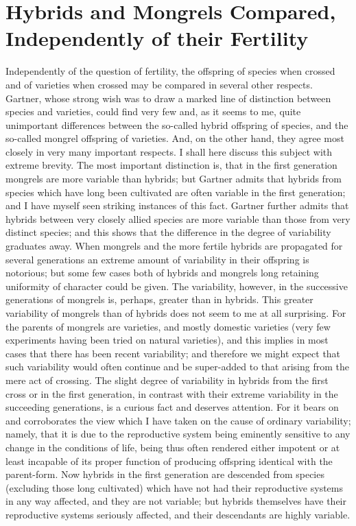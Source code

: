 \section{Hybrids and Mongrels Compared, Independently of their Fertility}
Independently of the question of fertility, the offspring of species when crossed and of varieties when crossed may be compared in several other respects. Gartner, whose strong wish was to draw a marked line of distinction between species and varieties, could find very few and, as it seems to me, quite unimportant differences between the so-called hybrid offspring of species, and the so-called mongrel offspring of varieties. And, on the other hand, they agree most closely in very many important respects.
I shall here discuss this subject with extreme brevity. The most important distinction is, that in the first generation mongrels are more variable than hybrids; but Gartner admits that hybrids from species which have long been cultivated are often variable in the first generation; and I have myself seen striking instances of this fact. Gartner further admits that hybrids between very closely allied species are more variable than those from very distinct species; and this shows that the difference in the degree of variability graduates away. When mongrels and the more fertile hybrids are propagated for several generations an extreme amount of variability in their offspring is notorious; but some few cases both of hybrids and mongrels long retaining uniformity of character could be given. The variability, however, in the successive generations of mongrels is, perhaps, greater than in hybrids.
This greater variability of mongrels than of hybrids does not seem to me at all surprising. For the parents of mongrels are varieties, and mostly domestic varieties (very few experiments having been tried on natural varieties), and this implies in most cases that there has been recent variability; and therefore we might expect that such variability would often continue and be super-added to that arising from the mere act of crossing. The slight degree of variability in hybrids from the first cross or in the first generation, in contrast with their extreme variability in the succeeding generations, is a curious fact and deserves attention. For it bears on and corroborates the view which I have taken on the cause of ordinary variability; namely, that it is due to the reproductive system being eminently sensitive to any change in the conditions of life, being thus often rendered either impotent or at least incapable of its proper function of producing offspring identical with the parent-form. Now hybrids in the first generation are descended from species (excluding those long cultivated) which have not had their reproductive systems in any way affected, and they are not variable; but hybrids themselves have their reproductive systems seriously affected, and their descendants are highly variable.
